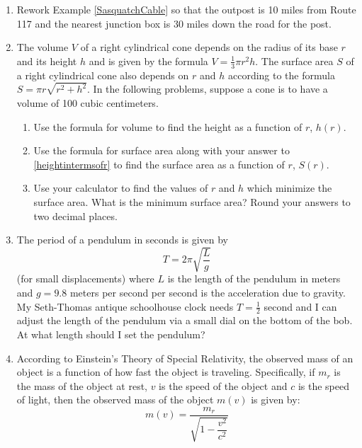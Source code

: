 \begin{enumerate}
\setcounter{enumi}{\value{HW}}

\item  Rework Example \ref{SasquatchCable} so that the outpost is 10 miles from Route 117 and the nearest junction box is 30 miles down the road for the post.


\item  The volume $V$ of a right cylindrical cone depends on the radius of its base $r$ and its height $h$ and is given by the formula $V = \frac{1}{3} \pi r^2 h$.  The surface area $S$ of a right cylindrical cone also depends on $r$ and $h$ according to the formula $S = \pi r \sqrt{r^2+h^2}$.  In the following problems, suppose a cone is to have a volume of 100 cubic centimeters. 

\begin{enumerate}

\item  \label{heightintermsofr} Use the formula for volume to find the height as a function of $r$, $h(r)$.
\item  Use the formula for surface area along with  your answer to \ref{heightintermsofr} to find the surface area as a function of $r$, $S(r)$.
\item  Use your calculator to find the values of $r$ and $h$ which minimize the surface area.  What is the minimum surface area?  Round your answers to two decimal places.

\end{enumerate}


\item \label{pendulumproblem} The period of a pendulum in seconds is given by \[T = 2\pi \sqrt{\dfrac{L}{g}}\](for small displacements) where $L$ is the length of the pendulum in meters and $g = 9.8$ meters per second per second is the acceleration due to gravity.  My Seth-Thomas antique schoolhouse clock needs $T = \frac{1}{2}$ second and I can adjust the length of the pendulum via a small dial on the bottom of the bob.  At what length should I set the pendulum?


\item According to Einstein's Theory of Special Relativity, the observed mass  of an object is a function of how fast the object is traveling.  Specifically, if  $m_{r}$ is the mass of the object at rest, $v$ is the speed of the object and $c$ is the speed of light, then the observed mass of the object $m(v)$ is given by:
\[m(v) = \dfrac{m_{r}}{\sqrt{1 - \dfrac{v^{2}}{c^{2}}}}\] 


\end{enumerate}
